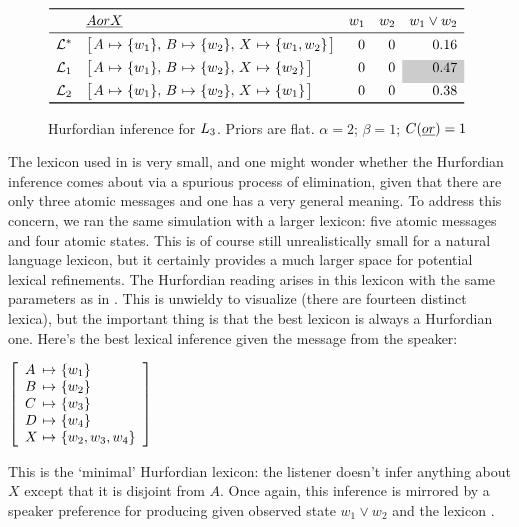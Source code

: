 \documentclass{article}
\begin{document}
\begin{figure}[tp]
  \centering
  $\begin{array}[c]{l l r r r}
    \toprule
     & \word{A or X}       & w_{1} & w_{2} & w_{1} \vee w_{2} \\
    \midrule
    \LexStar & \smallhurfordlex{w_{1}}{w_{2}}{w_{1}, w_{2}} & 0 & 0 & 0.16 \\[1ex]
    \Lex_{1} & \smallhurfordlex{w_{1}}{w_{2}}{w_{2}} & 0 & 0 & \graycell{0.47} \\[1ex]
    \Lex_{2} & \smallhurfordlex{w_{1}}{w_{2}}{w_{1}} & 0 & 0 & 0.38 \\
    \bottomrule
  \end{array}$
  \caption{Hurfordian inference for $\ListenerK[3]$.
    Priors are flat. 
    $\alpha = 2$; 
    $\beta = 1$; 
    $\Costs(\word{or}) = 1$}
  \label{fig:hurford}
\end{figure}

The lexicon used in  is very small, and one might
wonder whether the Hurfordian inference comes about via a spurious
process of elimination, given that there are only three atomic
messages and one has a very general meaning. To address this concern,
we ran the same simulation with a larger lexicon: five atomic messages
and four atomic states. This is of course still unrealistically small
for a natural language lexicon, but it certainly provides a much
larger space for potential lexical refinements. The Hurfordian reading
arises in this lexicon with the same parameters as in
. This is unwieldy to visualize (there are
fourteen distinct lexica), but the important thing is that the best
lexicon is always a Hurfordian one. Here's the best lexical inference
given the message  from the speaker:
 
\begin{examples}
\item\label{hurford-lex-large}  
  $\left[
    \begin{array}[c]{l@{ \ \mapsto \ }l}
      A & \set{w_{1}} \\
      B & \set{w_{2}} \\
      C & \set{w_{3}} \\
      D & \set{w_{4}} \\
      X & \set{w_{2}, w_{3}, w_{4}}
    \end{array}
  \right]$
\end{examples}
%
This is the `minimal' Hurfordian lexicon: the listener doesn't infer
anything about $X$ except that it is disjoint from $A$. Once again,
this inference is mirrored by a speaker preference for producing
 given observed state $w_{1} \vee w_{2}$ and the lexicon
.
\end{document}
